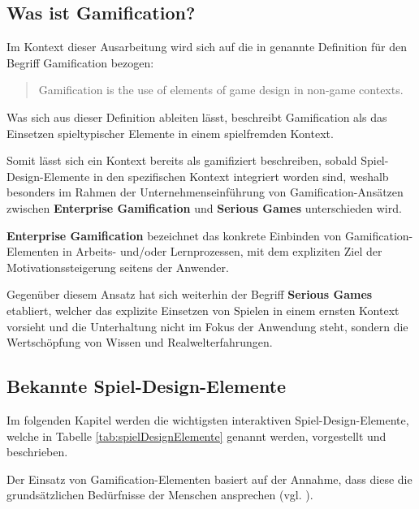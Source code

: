 \documentclass[bibliography=totoc,listof=totoc,BCOR=5mm,DIV=12,oneside]{scrbook}
\begin{document}
\subsection{Was ist Gamification?}
\par Im Kontext dieser Ausarbeitung wird sich auf die in \citep{deterding2011gamification} genannte Definition für den Begriff \grqq Gamification\grqq{} bezogen:
\begin{quotation} 
Gamification is the use of elements of game design in non-game contexts. 
\end{quotation}
\par Was sich aus dieser Definition ableiten lässt, beschreibt  Gamification als das Einsetzen spieltypischer Elemente in einem spielfremden Kontext.
\par Somit lässt sich ein Kontext bereits als \grqq gamifiziert\grqq{}
beschreiben, sobald Spiel-Design-Elemente in den spezifischen Kontext integriert worden sind, weshalb besonders im Rahmen der Unternehmenseinführung von Gamification-Ansätzen zwischen \textbf{Enterprise Gamification} und \textbf{Serious Games} unterschieden wird\citep[vgl. Kapitel 1.1 Gamification: Definition und Abgrenzung, Seite 4]{Sailer2016}.
\par \bigskip \textbf{Enterprise Gamification} bezeichnet das konkrete Einbinden von Gamification-Elementen in Arbeits- und/oder Lernprozessen, mit dem expliziten Ziel der Motivationssteigerung seitens der Anwender.
\par \bigskip Gegenüber diesem Ansatz hat sich weiterhin der Begriff \textbf{Serious Games} etabliert, welcher das explizite Einsetzen von Spielen in einem ernsten Kontext vorsieht und die Unterhaltung nicht im Fokus der Anwendung steht, sondern die Wertschöpfung von Wissen und Realwelterfahrungen. 

\newpage
\subsection{Bekannte Spiel-Design-Elemente} \label{sub:grundlagenSpielDesignElemente}

\par Im folgenden Kapitel werden die wichtigsten interaktiven Spiel-Design-Elemente, welche in Tabelle \ref{tab:spielDesignElemente} genannt werden, vorgestellt und beschrieben. 
\par Der Einsatz von Gamification-Elementen basiert auf der Annahme, dass diese die grundsätzlichen Bedürfnisse der Menschen ansprechen (vgl. \citep[Kapitel 1.1 Enterprise Gamification - Vorgehen und Anwendung, Seite 5]{Sailer2016}).
\end{document}
